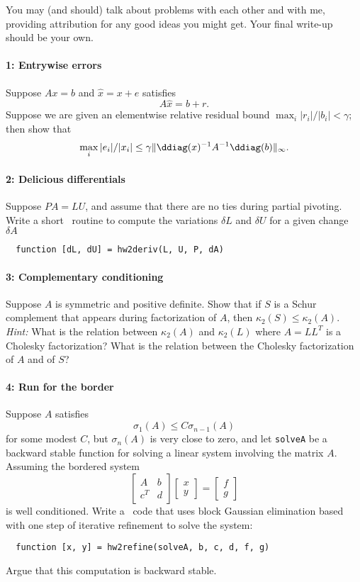 \documentclass[12pt, leqno]{article} %
\begin{document}

You may (and should) talk about problems with each other and with me,
providing attribution for any good ideas you might get.  Your final
write-up should be your own.

\paragraph*{1: Entrywise errors}
Suppose $Ax = b$ and $\hat{x} = x + e$ satisfies
\[
  A \hat{x} = b + r.
\]
Suppose we are given an elementwise relative residual bound
$\max_i |r_i|/|b_i| < \gamma$; then show that
\[
  \max_i |e_i|/|x_i| \leq
  \gamma \|\ddiag(x)^{-1} A^{-1} \ddiag(b)\|_\infty.
\]

\paragraph*{2: Delicious differentials}
Suppose $PA = LU$, and assume that there are no ties during partial
pivoting.  Write a short \matlab\ routine to compute the variations
$\delta L$ and $\delta U$ for a given change $\delta A$
\begin{lstlisting}
  function [dL, dU] = hw2deriv(L, U, P, dA)
\end{lstlisting}

\paragraph*{3: Complementary conditioning}
Suppose $A$ is symmetric and positive definite.  Show that if $S$
is a Schur complement that appears during factorization of $A$,
then $\kappa_2(S) \leq \kappa_2(A)$.  {\em Hint:} What is the
relation between $\kappa_2(A)$ and $\kappa_2(L)$ where $A = LL^T$
is a Cholesky factorization?  What is the relation between the
Cholesky factorization of $A$ and of $S$?

\paragraph*{4: Run for the border}
Suppose $A$ satisfies
\[
  \sigma_1(A) \leq C \sigma_{n-1}(A)
\]
for some modest $C$, but $\sigma_n(A)$ is very close to zero,
and let {\tt solveA} be a backward stable function for solving
a linear system involving the matrix $A$.  Assuming the bordered
system
\[
  \begin{bmatrix} A & b \\ c^T & d \end{bmatrix}
  \begin{bmatrix} x \\ y \end{bmatrix} =
  \begin{bmatrix} f \\ g \end{bmatrix}
\]
is well conditioned.  Write a \matlab\ code that uses
block Gaussian elimination based with one
step of iterative refinement to solve the system:
\begin{lstlisting}
  function [x, y] = hw2refine(solveA, b, c, d, f, g)
\end{lstlisting}
Argue that this computation is backward stable.
\end{document}
